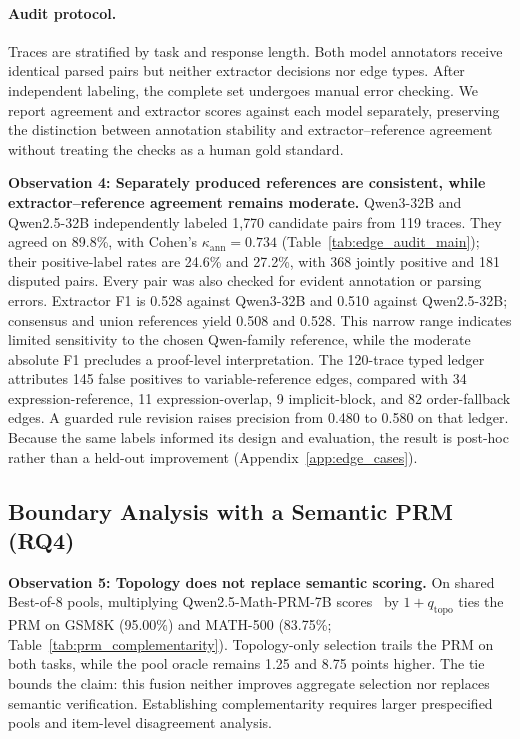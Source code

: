 \paragraph{Audit protocol.}
Traces are stratified by task and response length. Both model annotators receive identical parsed pairs but neither extractor decisions nor edge types. After independent labeling, the complete set undergoes manual error checking. We report agreement and extractor scores against each model separately, preserving the distinction between annotation stability and extractor--reference agreement without treating the checks as a human gold standard.



\noindent\textbf{Observation 4: Separately produced references are consistent, while extractor--reference agreement remains moderate.}
Qwen3-32B and Qwen2.5-32B independently labeled 1{,}770 candidate pairs from 119 traces. They agreed on 89.8\%, with Cohen's $\kappa_{\mathrm{ann}}=0.734$ (Table~\ref{tab:edge_audit_main}); their positive-label rates are 24.6\% and 27.2\%, with 368 jointly positive and 181 disputed pairs. Every pair was also checked for evident annotation or parsing errors. Extractor F1 is 0.528 against Qwen3-32B and 0.510 against Qwen2.5-32B; consensus and union references yield 0.508 and 0.528. This narrow range indicates limited sensitivity to the chosen Qwen-family reference, while the moderate absolute F1 precludes a proof-level interpretation. The 120-trace typed ledger attributes 145 false positives to variable-reference edges, compared with 34 expression-reference, 11 expression-overlap, 9 implicit-block, and 82 order-fallback edges. A guarded rule revision raises precision from 0.480 to 0.580 on that ledger. Because the same labels informed its design and evaluation, the result is post-hoc rather than a held-out improvement (Appendix~\ref{app:edge_cases}).

\subsection{Boundary Analysis with a Semantic PRM (RQ4)}
\label{sec:rq4}



\noindent\textbf{Observation 5: Topology does not replace semantic scoring.}
On shared Best-of-8 pools, multiplying Qwen2.5-Math-PRM-7B scores~\citep{zhang2025qwen25mathprm} by $1+q_{\mathrm{topo}}$ ties the PRM on GSM8K (95.00\%) and MATH-500 (83.75\%; Table~\ref{tab:prm_complementarity}). Topology-only selection trails the PRM on both tasks, while the pool oracle remains 1.25 and 8.75 points higher. The tie bounds the claim: this fusion neither improves aggregate selection nor replaces semantic verification. Establishing complementarity requires larger prespecified pools and item-level disagreement analysis.

